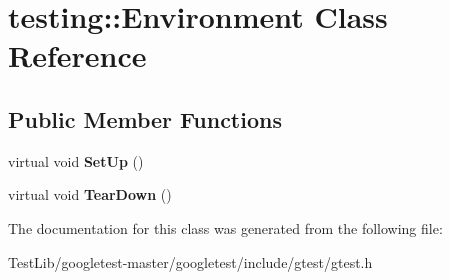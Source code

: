 \hypertarget{classtesting_1_1Environment}{}\section{testing\+:\+:Environment Class Reference}
\label{classtesting_1_1Environment}
\subsection*{Public Member Functions}
\begin{DoxyCompactItemize}
\item 
\mbox{\label{classtesting_1_1Environment_a1bf8cafaa9d4eba9feb98655ee434eb3}} 
virtual void {\bfseries Set\+Up} ()
\item 
\mbox{\label{classtesting_1_1Environment_a039bdaa705c46b9b88234cf4d3bb6254}} 
virtual void {\bfseries Tear\+Down} ()
\end{DoxyCompactItemize}


The documentation for this class was generated from the following file\+:\begin{DoxyCompactItemize}
\item 
Test\+Lib/googletest-\/master/googletest/include/gtest/gtest.\+h\end{DoxyCompactItemize}
